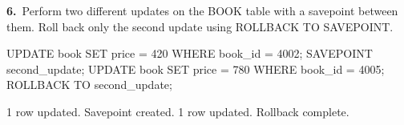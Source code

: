 \noindent\begin{minipage}{\linewidth}
\begingroup{}
{\fontsize{14}{17}\selectfont\textbf{6.}}\ Perform two different updates on the BOOK table with a savepoint between them. Roll back only the second update using ROLLBACK TO SAVEPOINT.\par
\endgroup\vspace{12pt}


\begin{sqlcode}
UPDATE book SET price = 420 WHERE book_id = 4002;
SAVEPOINT second_update;
UPDATE book SET price = 780 WHERE book_id = 4005;
ROLLBACK TO second_update;
\end{sqlcode}

\vspace{18pt}


\begin{sqlout}[fontsize=\small]
1 row updated.
Savepoint created.
1 row updated.
Rollback complete.
\end{sqlout}
\end{minipage}\par\vspace{24pt}

